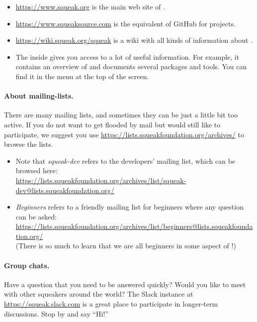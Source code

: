 \documentclass[a4paper,10pt,twoside]{book}
\begin{document}
\begin{itemize}
\item \url{https://www.squeak.org} is the main web site of \sq.

\item \url{https://www.squeaksource.com} is the equivalent of GitHub for \sq projects.

\item \url{https://wiki.squeak.org/squeak} is a wiki with all kinds of information about \sq.

\item The  inside \sq gives you access to a lot of useful information.
For example, it contains an overview of  and documents several packages and tools.
You can find it in the  menu at the top of the screen.
\end{itemize}

\paragraph{About mailing-lists.}
There are many mailing lists, and sometimes they can be just a little bit too active.
If you do not want to get flooded by mail but would still like to participate, we suggest you use \url{https://lists.squeakfoundation.org/archives/} to browse the lists.

\begin{itemize}
\item Note that \emph{squeak-dev} refers to the developers' mailing list, which can be browsed here:\\
\url{https://lists.squeakfoundation.org/archives/list/squeak-dev@lists.squeakfoundation.org/}
\item \emph{Beginners} refers to a friendly mailing list for beginners where any question can be asked:\\
\url{https://lists.squeakfoundation.org/archives/list/beginners@lists.squeakfoundation.org/}\\
(There is so much to learn that we are all beginners in some aspect of \sq!)
\end{itemize}

\paragraph{Group chats.}
Have a question that you need to be answered quickly?
Would you like to meet with other squeakers around the world?
The Slack instance at \url{https://squeak.slack.com} is a great place to participate in longer-term discussions.
Stop by and say ``Hi!''
\end{document}
